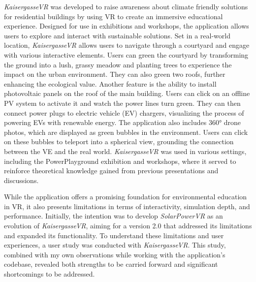 \documentclass[draft, final]{vutinfth} %
\begin{document}
\textit{KaisergasseVR} was developed to raise awareness about climate friendly solutions for residential buildings by using VR to create an immersive educational experience. Designed for use in exhibitions and workshops, the application allows users to explore and interact with sustainable solutions. Set in a real-world location, \textit{KaisergasseVR} allows users to navigate through a courtyard and engage with various interactive elements. Users can green the courtyard by transforming the ground into a lush, grassy meadow and planting trees to experience the impact on the urban environment. They can also green two roofs, further enhancing the ecological value. Another feature is the ability to install photovoltaic panels on the roof of the main building. Users can click on an offline PV system to activate it and watch the power lines turn green. They can then connect power plugs to electric vehicle (EV) chargers, visualizing the process of powering EVs with renewable energy. The application also includes 360° drone photos, which are displayed as green bubbles in the environment. Users can click on these bubbles to teleport into a spherical view, grounding the connection between the VE and the real world. \textit{KaisergasseVR} was used in various settings, including the PowerPlayground exhibition and workshops, where it served to reinforce theoretical knowledge gained from previous presentations and discussions.

While the application offers a promising foundation for environmental education in VR, it also presents limitations in terms of interactivity, simulation depth, and performance. Initially, the intention was to develop \textit{SolarPowerVR} as an evolution of \textit{KaisergasseVR}, aiming for a version 2.0 that addressed its limitations and expanded its functionality. To understand these limitations and user experiences, a user study was conducted with \textit{KaisergasseVR}. This study, combined with my own observations while working with the application's codebase, revealed both strengths to be carried forward and significant shortcomings to be addressed.
\end{document}
